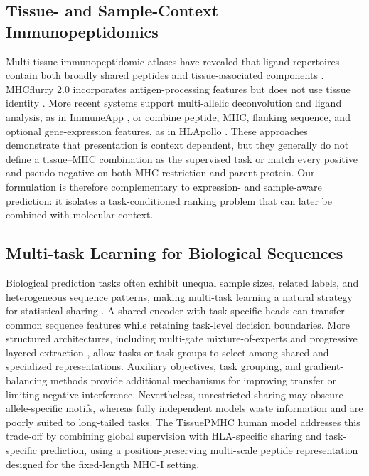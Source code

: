 \subsection{Tissue- and Sample-Context Immunopeptidomics}

Multi-tissue immunopeptidomic atlases have revealed that ligand repertoires contain both broadly shared peptides and tissue-associated components \cite{marcu2021atlas,schuster2018mouse}. MHCflurry 2.0 incorporates antigen-processing features but does not use tissue identity \cite{odonnell2020mhcflurry}. More recent systems support multi-allelic deconvolution and ligand analysis, as in ImmuneApp \cite{xu2024immuneapp}, or combine peptide, MHC, flanking sequence, and optional gene-expression features, as in HLApollo \cite{thrift2024hlapollo}. These approaches demonstrate that presentation is context dependent, but they generally do not define a tissue--MHC combination as the supervised task or match every positive and pseudo-negative on both MHC restriction and parent protein. Our formulation is therefore complementary to expression- and sample-aware prediction: it isolates a task-conditioned ranking problem that can later be combined with molecular context.

\subsection{Multi-task Learning for Biological Sequences}

Biological prediction tasks often exhibit unequal sample sizes, related labels, and heterogeneous sequence patterns, making multi-task learning a natural strategy for statistical sharing \cite{caruana1997multitask,ruder2017overview}. A shared encoder with task-specific heads can transfer common sequence features while retaining task-level decision boundaries. More structured architectures, including multi-gate mixture-of-experts \cite{ma2018mmoe} and progressive layered extraction \cite{tang2020ple}, allow tasks or task groups to select among shared and specialized representations. Auxiliary objectives, task grouping, and gradient-balancing methods provide additional mechanisms for improving transfer or limiting negative interference. Nevertheless, unrestricted sharing may obscure allele-specific motifs, whereas fully independent models waste information and are poorly suited to long-tailed tasks. The TissuePMHC human model addresses this trade-off by combining global supervision with HLA-specific sharing and task-specific prediction, using a position-preserving multi-scale peptide representation designed for the fixed-length MHC-I setting.

